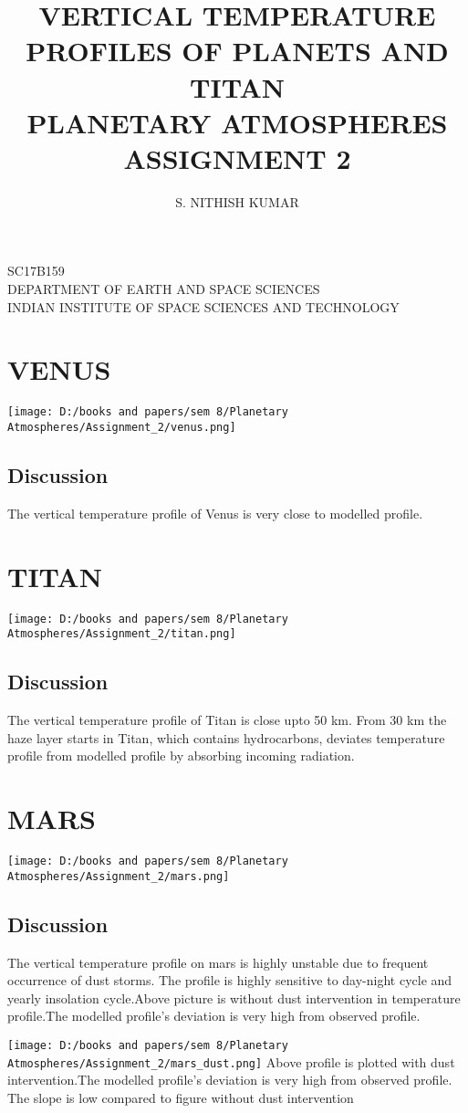 \documentclass[a4paper,12pt]{article}
\begin{document}
\title{{VERTICAL TEMPERATURE PROFILES OF PLANETS AND TITAN}\\\Large{PLANETARY ATMOSPHERES\\ASSIGNMENT 2}}
\date{}
\maketitle
\pagebreak
\begin{flushright}
\author{\Large S. NITHISH KUMAR\\}
SC17B159\\DEPARTMENT OF EARTH AND SPACE SCIENCES\\
INDIAN INSTITUTE OF SPACE SCIENCES AND TECHNOLOGY
\end{flushright}
\pagebreak
\section*{VENUS}
\texttt{[image: D:/books and papers/sem 8/Planetary Atmospheres/Assignment\_2/venus.png]}
\subsection*{Discussion}
The vertical temperature profile of Venus is very close to modelled profile.

\section*{TITAN}
\texttt{[image: D:/books and papers/sem 8/Planetary Atmospheres/Assignment\_2/titan.png]}
\subsection*{Discussion}
The vertical temperature profile of Titan is close upto 50 km. From 30 km the haze layer starts in Titan, which contains hydrocarbons, deviates temperature profile from modelled profile by absorbing incoming radiation. 


\section*{MARS}
\texttt{[image: D:/books and papers/sem 8/Planetary Atmospheres/Assignment\_2/mars.png]}
\subsection*{Discussion}
The vertical temperature profile on mars is highly unstable due to frequent occurrence of dust storms. The profile is highly sensitive  to day-night cycle and yearly insolation cycle.Above picture is without dust intervention in temperature profile.The modelled profile's deviation is very high from observed profile.
 
\texttt{[image: D:/books and papers/sem 8/Planetary Atmospheres/Assignment\_2/mars\_dust.png]}
Above profile is plotted with dust intervention.The modelled profile's deviation is very high from observed profile. The slope is low compared to figure without dust intervention 
\end{document}
